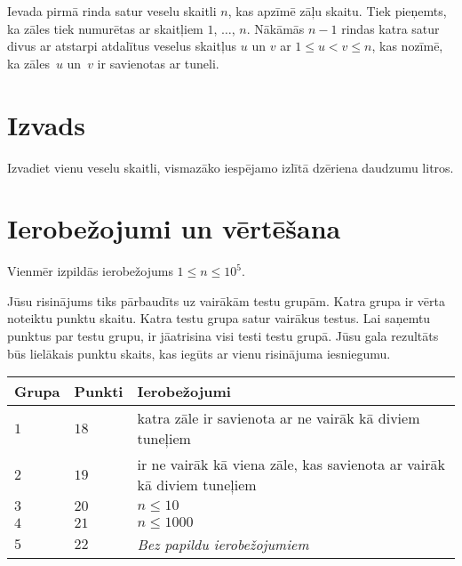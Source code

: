 Ievada pirmā rinda satur veselu skaitli $n$, kas apzīmē zāļu skaitu.
Tiek pieņemts, ka zāles tiek numurētas ar skaitļiem $1$, $\ldots$, $n$.
Nākāmās $n-1$ rindas katra satur divus ar atstarpi atdalītus veselus skaitļus $u$ un $v$ ar 
$1\leq u < v \leq n$, %
kas nozīmē, ka zāles~$u$ un~$v$ ir savienotas ar tuneli.

\section*{Izvads}

Izvadiet vienu veselu skaitli, vismazāko iespējamo izlītā dzēriena daudzumu litros.

\section*{Ierobežojumi un vērtēšana}

Vienmēr izpildās ierobežojums
$1\leq n\leq 10^5$. %

Jūsu risinājums tiks pārbaudīts uz vairākām testu grupām. Katra grupa ir vērta noteiktu punktu skaitu.
Katra testu grupa satur vairākus testus.
Lai saņemtu punktus par testu grupu, ir jāatrisina visi testi testu grupā.
Jūsu gala rezultāts būs lielākais punktu skaits, kas iegūts ar vienu risinājuma iesniegumu.

\medskip
\begin{tabular}{lll}
Grupa & Punkti & Ierobežojumi \\\hline
  $1$ & $18$ & katra zāle ir savienota ar ne vairāk kā diviem tuneļiem\\
  $2$ & $19$ & ir ne vairāk kā viena zāle, kas savienota ar vairāk kā diviem tuneļiem\\
  $3$ & $20$ & $n\leq 10$\\
  $4$ & $21$ & $n\leq 1000$\\
  $5$ & $22$ & \emph{Bez papildu ierobežojumiem}
\end{tabular}
